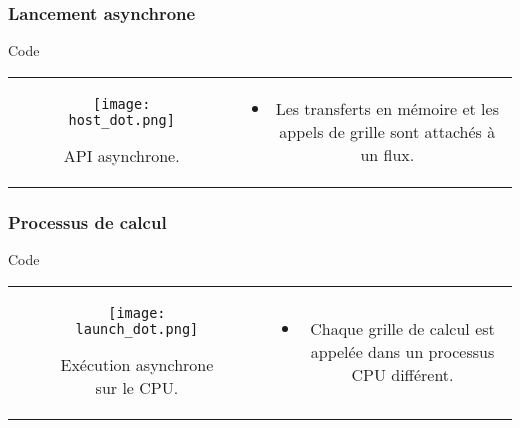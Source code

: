 \begin{frame}
    \frametitle{Lancement asynchrone}
\begin{block}{Code}
   \begin{tabular}{cc}
        \begin{minipage}{0.45\textwidth}
 \begin{figure}[htbp]
    \centering
   \texttt{[image: host\_dot.png]}
    \caption{API asynchrone.}
    \label{fig:launch_dot}
\end{figure}
        \end{minipage} & 
        \begin{minipage}{0.45\textwidth}
            \begin{itemize}
                \item<+-> Les transferts en mémoire et les appels de grille sont attachés à un flux.
           \end{itemize}
        \end{minipage}
\end{tabular}
\end{block}
\end{frame}
\begin{frame}
    \frametitle{Processus de calcul}
\begin{block}{Code}
   \begin{tabular}{cc}
        \begin{minipage}{0.45\textwidth}
 \begin{figure}[htbp]
    \centering
   \texttt{[image: launch\_dot.png]}
    \caption{Exécution asynchrone sur le CPU.}
    \label{fig:launch_dot}
\end{figure}
        \end{minipage} & 
        \begin{minipage}{0.45\textwidth}
            \begin{itemize}
                \item<+-> Chaque grille de calcul est appelée dans un processus CPU différent.
           \end{itemize}
        \end{minipage}
\end{tabular}
\end{block}
\end{frame}
